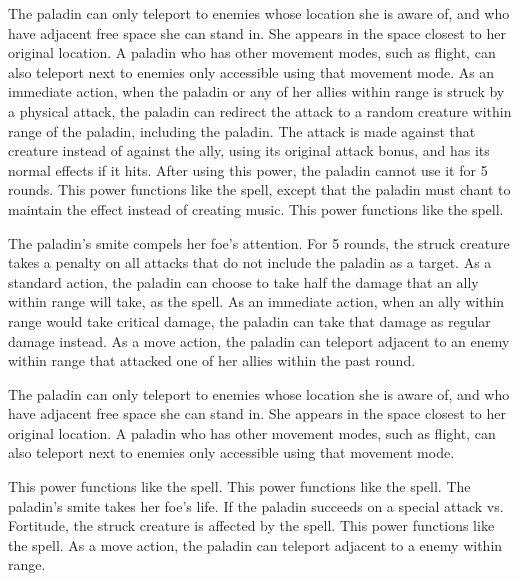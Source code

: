 The paladin can only teleport to enemies whose location she is aware of, and who have adjacent free space she can stand in.
She appears in the space closest to her original location.
A paladin who has other movement modes, such as flight, can also teleport next to enemies only accessible using that movement mode.
As an immediate action, when the paladin or any of her allies within \rngclose range is struck by a physical attack, the paladin can redirect the attack to a random creature within \rngclose range of the paladin, including the paladin.
The attack is made against that creature instead of against the ally, using its original attack bonus, and has its normal effects if it hits.
After using this power, the paladin cannot use it for 5 rounds.
 This power functions like the 
spell, except that the paladin must chant to maintain the effect instead of creating music.
 This power functions like the 
spell.

The paladin's smite compels her foe's attention.
For 5 rounds, the struck creature takes a  penalty on all attacks that do not include the paladin as a target.
 As a standard action, the paladin can choose to take half the damage that an ally within \rngmed range will take, as the 
spell.
As an immediate action, when an ally within \rngmed range would take critical damage, the paladin can take that damage as regular damage instead.
As a move action, the paladin can teleport adjacent to an enemy within \rngmed range that attacked one of her allies within the past round.

The paladin can only teleport to enemies whose location she is aware of, and who have adjacent free space she can stand in.
She appears in the space closest to her original location.
A paladin who has other movement modes, such as flight, can also teleport next to enemies only accessible using that movement mode.

 This power functions like the 
spell.
 This power functions like the 
spell.
The paladin's smite takes her foe's life.
If the paladin succeeds on a special attack vs. Fortitude, the struck creature is affected by the  spell.
 This power functions like the 
spell.
As a move action, the paladin can teleport adjacent to a \bloodied enemy within \rngmed range.

